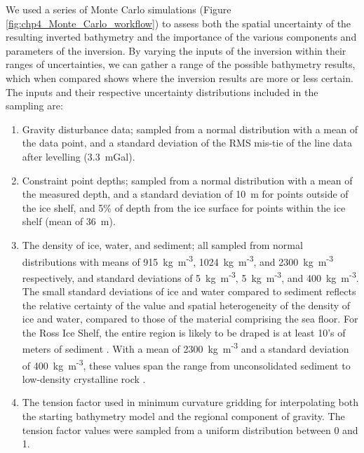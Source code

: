 We used a series of Monte Carlo simulations (Figure \ref{fig:chp4_Monte_Carlo_workflow}) to assess both the spatial uncertainty of the resulting inverted bathymetry and the importance of the various components and parameters of the inversion. By varying the inputs of the inversion within their ranges of uncertainties, we can gather a range of the possible bathymetry results, which when compared shows where the inversion results are more or less certain. The inputs and their respective uncertainty distributions included in the sampling are:
\begin{enumerate}
    \item 
    Gravity disturbance data; sampled from a normal distribution with a mean of the data point, and a standard deviation of the RMS mis-tie of the line data after levelling (3.3~mGal).
    \item 
    Constraint point depths; sampled from a normal distribution with a mean of the measured depth, and a standard deviation of 10~m for points outside of the ice shelf, and 5\% of depth from the ice surface for points within the ice shelf (mean of 36~m).
    \item 
    The density of ice, water, and sediment; all sampled from normal distributions with means of 915~kg~m\textsuperscript{-3}, 1024~kg~m\textsuperscript{-3}, and 2300~kg~m\textsuperscript{-3} respectively, and standard deviations of 5~kg~m\textsuperscript{-3}, 5~kg~m\textsuperscript{-3}, and 400~kg~m\textsuperscript{-3}. The small standard deviations of ice and water compared to sediment reflects the relative certainty of the value and spatial heterogeneity of the density of ice and water, compared to those of the material comprising the sea floor. For the Ross Ice Shelf, the entire region is likely to be draped is at least 10's of meters of sediment \citep[Chapter \ref{ch:2},][]{tankersleybasement2022}. With a mean of 2300~kg~m\textsuperscript{-3} and a standard deviation of 400~kg~m\textsuperscript{-3}, these values span the range from unconsolidated sediment to low-density crystalline rock \citep{schöndensity2015}. 
    \item 
    The tension factor used in minimum curvature gridding for interpolating both the starting bathymetry model and the regional component of gravity. The tension factor values were sampled from a uniform distribution between 0 and 1. 
\end{enumerate}


